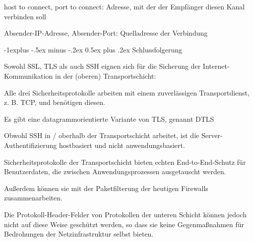 \documentclass[a4paper]{article}
\makeatletter
\renewcommand{\subsection}{\@startsection{subsection}{2}{0mm}%
 {-1explus -.5ex minus -.2ex}%
 {0.5ex plus .2ex}%
 {\normalfont\normalsize\bfseries}}
\makeatother
\begin{document}
\begin{multicols}{3}
\begin{itemize*}
\begin{itemize*}
\begin{itemize*}
                        \begin{itemize*} \item host to connect, port to connect: Adresse, mit der der Empfänger diesen Kanal verbinden soll \item Absender-IP-Adresse, Absender-Port: Quelladresse der Verbindung \end{itemize*}
                  \end{itemize*}
            \end{itemize*}

            \subsection{Schlussfolgerung}
            \begin{itemize*}
                  \item       Sowohl SSL, TLS als auch SSH eignen sich für die Sicherung der
                  Internet-Kommunikation in der (oberen) Transportschicht:
                  \begin{itemize*}
                        \item Alle drei Sicherheitsprotokolle arbeiten mit einem zuverlässigen Transportdienst, z. B. TCP, und benötigen diesen.
                        \item Es gibt eine datagrammorientierte Variante von TLS, genannt DTLS
                        \item Obwohl SSH in / oberhalb der Transportschicht arbeitet, ist die Server-Authentifizierung hostbasiert und nicht anwendungsbasiert.
                        \item Sicherheitsprotokolle der Transportschicht bieten echten End-to-End-Schutz für Benutzerdaten, die zwischen Anwendungsprozessen ausgetauscht werden.
                        \item Außerdem können sie mit der Paketfilterung der heutigen Firewalls zusammenarbeiten.
                        \item Die Protokoll-Header-Felder von Protokollen der unteren Schicht können jedoch nicht auf diese Weise geschützt werden, so dass sie keine Gegenmaßnahmen für Bedrohungen der Netzinfrastruktur selbst bieten.
                  \end{itemize*}
            \end{itemize*}


\end{itemize*}
\end{multicols}
\end{document}
